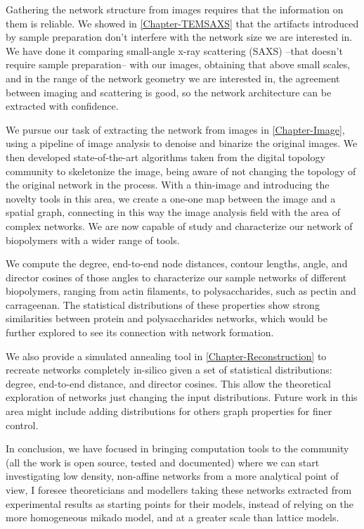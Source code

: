 Gathering the network structure from images requires that the information on them is reliable. We showed in \autoref{Chapter-TEMSAXS} that the artifacts introduced by sample preparation don't interfere with the network size we are interested in. We have done it comparing small-angle x-ray scattering (SAXS) --that doesn't require sample preparation-- with our images, obtaining that above small scales, and in the range of the network geometry we are interested in, the agreement between imaging and scattering is good, so the network architecture can be extracted with confidence.

We pursue our task of extracting the network from images in \autoref{Chapter-Image}, using a pipeline of image analysis to denoise and binarize the original images. We then developed state-of-the-art algorithms taken from the digital topology community to skeletonize the image, being aware of not changing the topology of the original network in the process. With a thin-image and introducing the novelty tools in this area, we create a one-one map between the image and a spatial graph, connecting in this way the image analysis field with the area of complex networks. We are now capable of study and characterize our network of biopolymers with a wider range of tools.

We compute the degree, end-to-end node distances, contour lengths, angle, and director cosines of those angles to characterize our sample networks of different biopolymers, ranging from actin filaments, to polysaccharides, such as pectin and carrageenan. The statistical distributions of these properties show strong similarities between protein and polysaccharides networks, which would be further explored to see its connection with network formation.

We also provide a simulated annealing tool in \autoref{Chapter-Reconstruction} to recreate networks completely in-silico given a set of statistical distributions: degree, end-to-end distance, and director cosines. This allow the theoretical exploration of networks just changing the input distributions. Future work in this area might include adding distributions for others graph properties for finer control.


In conclusion, we have focused in bringing computation tools to the community (all the work is open source, tested and documented) where we can start investigating low density, non-affine networks from a more analytical point of view, I foresee theoreticians and modellers taking these networks extracted from experimental results as starting points for their models, instead of relying on the more homogeneous mikado model, and at a greater scale than lattice models.

